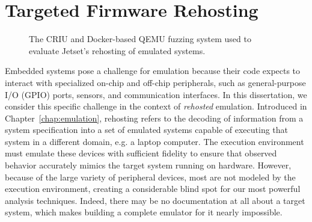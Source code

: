 \chapter{Targeted Firmware Rehosting}
\label{chap:rehost}

\begin{figure}
\centering
{}
\caption{The CRIU and Docker-based QEMU fuzzing system used to evaluate Jetset's rehosting of emulated systems.}
\label{fig:fuzzing}
\end{figure}

Embedded systems pose a challenge for emulation because their code expects to interact with specialized on-chip and off-chip peripherals, such as general-purpose I/O (GPIO) ports, sensors, and communication interfaces. 
In this dissertation, we consider this specific challenge in the context of \emph{rehosted} emulation.
Introduced in Chapter~\ref{chap:emulation}, rehosting refers to the decoding of information from a system specification into a set of emulated systems capable of executing that system in a different domain, e.g. a laptop computer.
The execution environment must emulate these devices with sufficient fidelity to ensure that observed behavior accurately mimics the target system running on hardware. 
However, because of the large variety of peripheral devices, most are not modeled by the execution environment, creating a considerable blind spot for our most powerful analysis techniques. 
Indeed, there may be no documentation at all about a target system, which makes building a complete emulator for it nearly impossible.

